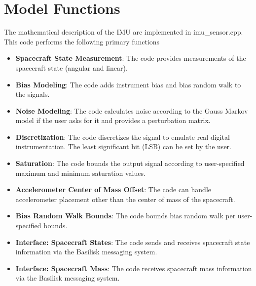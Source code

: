 \section{Model Functions}
The mathematical description of the IMU are implemented in imu\_sensor.cpp. This code performs the following primary functions
\begin{itemize}
	\item \textbf{Spacecraft State Measurement}: The code provides measurements of the spacecraft state (angular and linear).
	\item \textbf{Bias Modeling}: The code adds instrument bias and bias random walk to the signals.
	\item \textbf{Noise Modeling}: The code calculates noise according to the Gauss Markov model if the user asks for it and provides a perturbation matrix.
	\item \textbf{Discretization}: The code discretizes the signal to emulate real digital instrumentation. The least significant bit (LSB) can be set by the user.
	\item \textbf{Saturation}: The code bounds the output signal according to user-specified maximum and minimum saturation values.
	\item \textbf{Accelerometer Center of Mass Offset}: The code can handle accelerometer placement other than the center of mass of the spacecraft.
	\item \textbf{Bias Random Walk Bounds}: The code bounds bias random walk per user-specified bounds.
	\item \textbf{Interface: Spacecraft States}: The code sends and receives spacecraft state information via the Basilisk messaging system.
	\item \textbf{Interface: Spacecraft Mass}: The code receives spacecraft mass information via the Basilisk messaging system.
\end{itemize}



